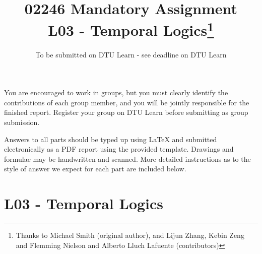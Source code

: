 \documentclass[12pt,a4paper]{article}
\title{02246 Mandatory Assignment\\
L03 - Temporal Logics\footnote{Thanks to Michael Smith (original author), and Lijun Zhang, Kebin Zeng and Flemming Nielson and Alberto Lluch Lafuente (contributors)}}
\date{To be submitted on DTU Learn - see deadline on DTU Learn}
\begin{document}
\maketitle

\noindent
You are encouraged to work in groups, 
but you must clearly identify the contributions of each group member, and you will be jointly responsible for the finished report. Register your group on DTU Learn before submitting as group submission. 
\par
Answers to all parts should be typed up using LaTeX and submitted electronically as a PDF report using the provided template. Drawings and formulae may be handwritten
and scanned. More detailed instructions as to the style of answer we expect for each part are included below.

\clearpage

\section*{L03 - Temporal Logics}

\newif\ifwithanswers
\withanswerstrue
\end{document}
